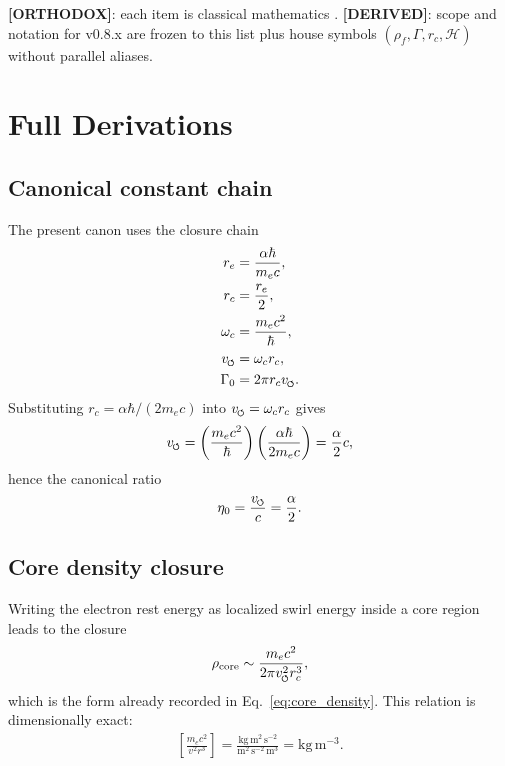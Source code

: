 \documentclass[11pt]{article}
\theoremstyle{definition}
\theoremstyle{plain}
\theoremstyle{remark}
\newcommand{\swirlarrow}{\mathchoice{\mkern-2mu\scriptstyle\boldsymbol{\circlearrowleft}}{\mkern-2mu\scriptstyle\boldsymbol{\circlearrowleft}}{\mkern-2mu\scriptscriptstyle\boldsymbol{\circlearrowleft}}{\mkern-2mu\scriptscriptstyle\boldsymbol{\circlearrowleft}}}
\newcommand{\rhoF}{{\rho_{\!f}}}
\newcommand{\rc}{{r_c}}
\begin{document}
        \textbf{[ORTHODOX]}: each item is classical mathematics \cite{Moffatt1969,White1969,Batchelor1967}. \textbf{[DERIVED]}: scope and notation for v0.8.x are frozen to this list plus house symbols $(\rhoF,\Gamma,\rc,\mathcal{H})$ without parallel aliases.

    \section{Full Derivations}
        \label{sec:appendix_derivations}

        \subsection{Canonical constant chain}
            The present canon uses the closure chain
            \begin{align}
                r_e &= \frac{\alpha \hbar}{m_e c}, \\
                r_c &= \frac{r_e}{2}, \\
                \omega_c &= \frac{m_e c^2}{\hbar}, \\
                v_{\swirlarrow} &= \omega_c r_c, \\
                \Gamma_0 &= 2\pi r_c v_{\swirlarrow}.
            \end{align}
            Substituting $r_c = \alpha\hbar/(2m_e c)$ into $v_{\swirlarrow}=\omega_c r_c$ gives
            \begin{align}
                v_{\swirlarrow}
                =
                \left(\frac{m_e c^2}{\hbar}\right)
                \left(\frac{\alpha \hbar}{2m_e c}\right)
                = \frac{\alpha}{2}c,
            \end{align}
            hence the canonical ratio
            \begin{align}
                \eta_0 = \frac{v_{\swirlarrow}}{c} = \frac{\alpha}{2}.
            \end{align}

        \subsection{Core density closure}
            Writing the electron rest energy as localized swirl energy inside a core region leads to the closure
            \begin{align}
                \rho_{\mathrm{core}}
                \sim
                \frac{m_e c^2}{2\pi v_{\swirlarrow}^2 r_c^3},
            \end{align}
            which is the form already recorded in Eq.~\eqref{eq:core_density}. This relation is dimensionally exact:
            \begin{align}
                \left[\frac{m_e c^2}{v^2 r^3}\right]
                =
                \frac{\mathrm{kg\,m^2\,s^{-2}}}{\mathrm{m^2\,s^{-2}}\,\mathrm{m^3}}
                = \mathrm{kg\,m^{-3}}.
            \end{align}
\end{document}
